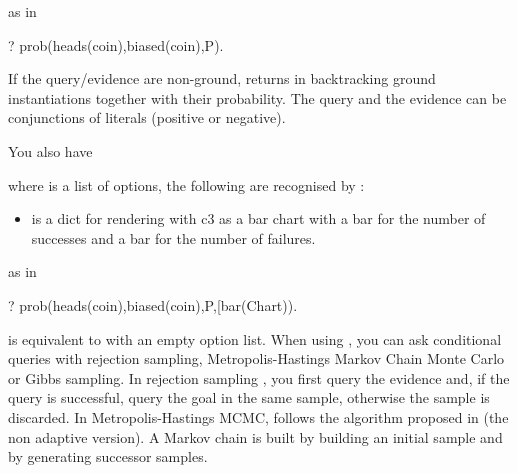 \documentclass[letterpaper,10pt,english]{sphinxmanual}
\begin{document}
\begin{sphinxVerbatim}[commandchars=\\\{\}]
  
\end{sphinxVerbatim}

as in

\begin{sphinxVerbatim}[commandchars=\\\{\}]
?\PYGZhy{} prob(heads(coin),biased(coin),P).
\end{sphinxVerbatim}

If the query/evidence are non-ground,  returns in backtracking ground
instantiations together with their probability.
The query and the evidence can be conjunctions of literals (positive or negative).

You also have

\begin{sphinxVerbatim}[commandchars=\\\{\}]
  
\end{sphinxVerbatim}

where  is a list of options, the following are recognised by :
\begin{itemize}
\item {} 
  is a dict for rendering with c3 as a bar chart with a bar for the number of successes and a bar for the number of failures.

\end{itemize}

as in

\begin{sphinxVerbatim}[commandchars=\\\{\}]
?\PYGZhy{} prob(heads(coin),biased(coin),P,[bar(Chart)\PYGZcb{}).
\end{sphinxVerbatim}

 is equivalent to  with an empty option list.
When using , you can ask conditional queries with rejection sampling,
Metropolis-Hastings Markov Chain Monte Carlo or Gibbs sampling.
In rejection sampling , you first query the evidence and, if the query is successful, query the goal in the same sample, otherwise the sample is discarded.
In Metropolis-Hastings MCMC,  follows the algorithm proposed in  (the non adaptive version).
A Markov chain is built by building an initial sample and by generating successor samples.
\end{document}
